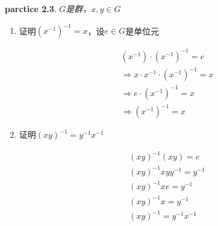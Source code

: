 \begin{mdframed}
    \textbf{parctice 2.3}.  \textsl{$G$是群，$x,y\in G$}
    \begin{enumerate}
        \item 证明$(x^{-1})^{-1}=x$，设$e\in G$是单位元

        \begin{equation}
            \begin{aligned}
                & (x^{-1})\cdot (x^{-1})^{-1}=e\\
                & \Rightarrow x\cdot x^{-1} \cdot (x^{-1})^{-1}=x\\
                & \Rightarrow e\cdot (x^{-1})^{-1}=x \\
                & \Rightarrow (x^{-1})^{-1}=x
            \end{aligned}
        \end{equation}

        \item 证明$(xy)^{-1}=y^{-1}x^{-1}$
        
        \begin{equation}
            \begin{aligned}
                & (xy)^{-1}(xy) = e \\
                & (xy)^{-1}xyy^{-1}=y^{-1}\\
                & (xy)^{-1}xe=y^{-1}\\
                & (xy)^{-1}x=y^{-1}\\
                & (xy)^{-1}=y^{-1}x^{-1}\\
            \end{aligned}
        \end{equation}

    \end{enumerate}
\end{mdframed}

